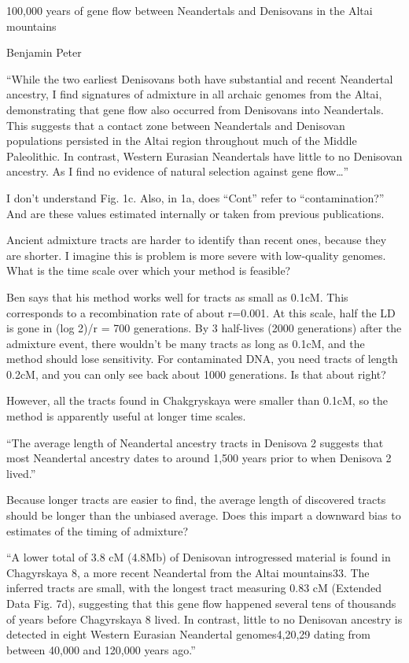 \documentclass{article}
\begin{document}
100,000 years of gene flow between Neandertals and Denisovans in the
Altai mountains

Benjamin Peter

``While the two earliest Denisovans both have substantial and recent
Neandertal ancestry, I find signatures of admixture in all archaic
genomes from the Altai, demonstrating that gene flow also occurred
from Denisovans into Neandertals. This suggests that a contact zone
between Neandertals and Denisovan populations persisted in the Altai
region throughout much of the Middle Paleolithic. In contrast, Western
Eurasian Neandertals have little to no Denisovan ancestry. As I find
no evidence of natural selection against gene flow\ldots''

I don't understand Fig. 1c. Also, in 1a, does ``Cont'' refer to
``contamination?'' And are these values estimated internally or taken
from previous publications.

Ancient admixture tracts are harder to identify than recent ones,
because they are shorter. I imagine this is problem is more severe
with low-quality genomes. What is the time scale over which your
method is feasible?

Ben says that his method works well for tracts as small as 0.1cM. This
corresponds to a recombination rate of about r=0.001. At this scale,
half the LD is gone in (log 2)/r = 700 generations. By 3 half-lives
(2000 generations) after the admixture event, there wouldn't be many
tracts as long as 0.1cM, and the method should lose sensitivity. For
contaminated DNA, you need tracts of length 0.2cM, and you can only
see back about 1000 generations. Is that about right?

However, all the tracts found in Chakgryskaya were smaller than 0.1cM,
so the method is apparently useful at longer time scales.

``The average length of Neandertal ancestry tracts in Denisova 2
suggests that most Neandertal ancestry dates to around 1,500 years
prior to when Denisova 2 lived.''

Because longer tracts are easier to find, the average length of
discovered tracts should be longer than the unbiased average. Does
this impart a downward bias to estimates of the timing of admixture?

``A lower total of 3.8 cM (4.8Mb) of Denisovan introgressed material
is found in Chagyrskaya 8, a more recent Neandertal from the Altai
mountains33. The inferred tracts are small, with the longest tract
measuring 0.83 cM (Extended Data Fig. 7d), suggesting that this gene
flow happened several tens of thousands of years before Chagyrskaya 8
lived. In contrast, little to no Denisovan ancestry is detected in
eight Western Eurasian Neandertal genomes4,20,29 dating from between
40,000 and 120,000 years ago.''
\end{document}
